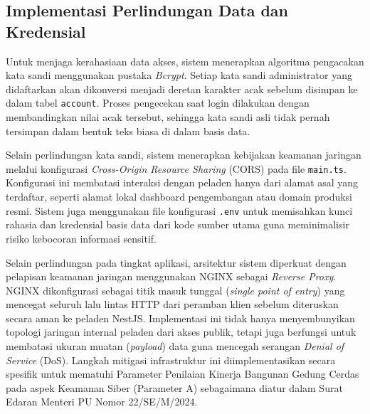 \subsection{Implementasi Perlindungan Data dan Kredensial}
Untuk menjaga kerahasiaan data akses, sistem menerapkan algoritma pengacakan kata sandi menggunakan pustaka \textit{Bcrypt}. Setiap kata sandi administrator yang didaftarkan akan dikonversi menjadi deretan karakter acak sebelum disimpan ke dalam tabel \texttt{account}. Proses pengecekan saat login dilakukan dengan membandingkan nilai acak tersebut, sehingga kata sandi asli tidak pernah tersimpan dalam bentuk teks biasa di dalam basis data.

Selain perlindungan kata sandi, sistem menerapkan kebijakan keamanan jaringan melalui konfigurasi \textit{Cross-Origin Resource Sharing} (CORS) pada file \texttt{main.ts}. Konfigurasi ini membatasi interaksi dengan peladen hanya dari alamat asal yang terdaftar, seperti alamat lokal dashboard pengembangan atau domain produksi resmi. Sistem juga menggunakan file konfigurasi \texttt{.env} untuk memisahkan kunci rahasia dan kredensial basis data dari kode sumber utama guna meminimalisir risiko kebocoran informasi sensitif.

Selain perlindungan pada tingkat aplikasi, arsitektur sistem diperkuat dengan pelapisan keamanan jaringan menggunakan NGINX sebagai \textit{Reverse Proxy}. NGINX dikonfigurasi sebagai titik masuk tunggal (\textit{single point of entry}) yang mencegat seluruh lalu lintas HTTP dari peramban klien sebelum diteruskan secara aman ke peladen NestJS. Implementasi ini tidak hanya menyembunyikan topologi jaringan internal peladen dari akses publik, tetapi juga berfungsi untuk membatasi ukuran muatan (\textit{payload}) data guna mencegah serangan \textit{Denial of Service} (DoS). Langkah mitigasi infrastruktur ini diimplementasikan secara spesifik untuk mematuhi Parameter Penilaian Kinerja Bangunan Gedung Cerdas pada aspek Keamanan Siber (Parameter A) sebagaimana diatur dalam Surat Edaran Menteri PU Nomor 22/SE/M/2024.